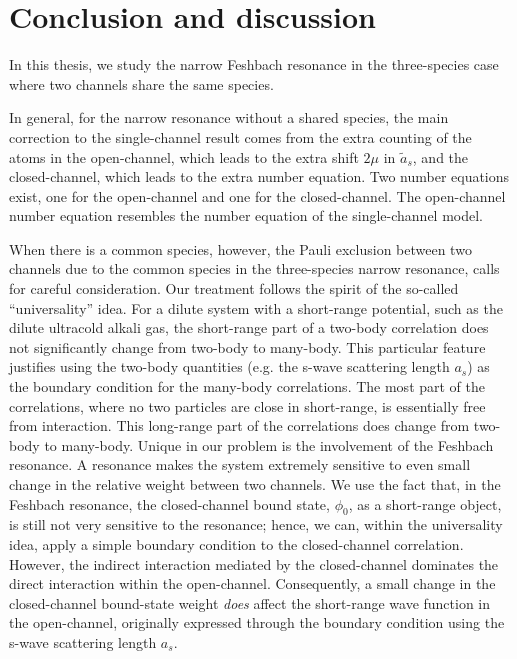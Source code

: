 \documentclass[reprint,pra]{revtex4-1}
\begin{document}
\section{Conclusion  and discussion\label{sec:conclusion}}
In this thesis, we study the narrow Feshbach resonance in  the three-species case where two channels share the same species.  

In general, for the narrow resonance without a shared species, the main correction to the single-channel result comes from the  extra counting of the atoms in the open-channel, which leads to the extra shift $2\mu$ in $\tilde{a}_{s}$, and the closed-channel, which leads to the extra number equation.  Two number equations exist, one for the open-channel and one for the closed-channel.  The open-channel number equation resembles the number equation of the single-channel model.

When there is a common species,  however, the  Pauli exclusion between two channels due to the common species in the three-species narrow resonance, calls for careful  consideration.  Our treatment follows the spirit of the so-called ``universality'' idea.  For a dilute system with a short-range potential, such as the dilute ultracold alkali gas, the short-range part of a two-body correlation does not significantly change from two-body  to many-body.  This particular feature justifies using the two-body quantities (e.g. the s-wave scattering length $a_{s}$) as the boundary condition for the many-body correlations.  The most part of the correlations, where no two particles are close in short-range, is essentially free from interaction. This long-range part of the correlations does change from two-body to many-body.  Unique in our problem is the involvement of the Feshbach resonance.  A resonance makes the system extremely sensitive to even small change in the relative weight between two channels. We use the fact that,  in the Feshbach resonance, the closed-channel bound state, $\phi_{0}$, as a short-range object,  is still not very sensitive to the resonance; hence, we can, within the universality idea,  apply a simple boundary condition to the closed-channel correlation. However, the indirect interaction mediated by the closed-channel dominates the direct interaction within the open-channel. Consequently, a small change in the closed-channel bound-state weight \emph{does} affect the short-range wave function in the open-channel, originally expressed through the boundary condition using the s-wave scattering length $a_{s}$. 
\end{document}
